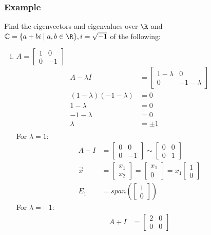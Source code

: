 \documentclass{math}
\begin{document}
\subsubsection*{Example}
Find the eigenvectors and eigenvalues over \( \R \) and \( \mathbb{C} =
\{a+bi\mid a,b\in\R\}, i = \sqrt{-1} \) of the following:
\begin{enumerate}[(i)]
  \item \( A = \begin{bmatrix}1 & 0 \\ 0 & -1\end{bmatrix} \)
  \begin{align*}
    A-\lambda I &= \begin{bmatrix}
      1-\lambda & 0 \\
      0 & -1-\lambda
    \end{bmatrix} \\
    (1-\lambda)(-1-\lambda) &= 0 \\
    1-\lambda &= 0 \\
    -1-\lambda &= 0 \\
    \lambda &= \pm1 \\
  \end{align*}
  For \( \lambda = 1 \):
  \begin{align*}
    A-I &= \begin{bmatrix}0 & 0 \\ 0 & -1\end{bmatrix}
      \sim \begin{bmatrix}0 & 0 \\ 0 & 1\end{bmatrix} \\
    \vec{x} &= \begin{bmatrix}x_1 \\ x_2\end{bmatrix}
      = \begin{bmatrix}x_1 \\ 0\end{bmatrix}
      = x_1\begin{bmatrix}1 \\ 0\end{bmatrix} \\
    E_1 &= span\left(\begin{bmatrix}1 \\ 0\end{bmatrix}\right)
  \end{align*}
  For \( \lambda = -1 \):
  \begin{align*}
    A+I &= \begin{bmatrix}2 & 0 \\ 0 & 0\end{bmatrix}

\end{align*}
\end{enumerate}
\end{document}
